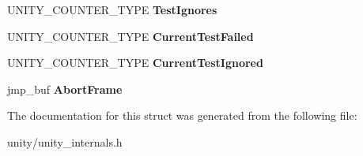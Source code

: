 \begin{DoxyCompactItemize}
\item 
\mbox{\label{struct_u_n_i_t_y___s_t_o_r_a_g_e___t_a4fd439067fb0c1a82a5219077a513cda}} 
U\+N\+I\+T\+Y\+\_\+\+C\+O\+U\+N\+T\+E\+R\+\_\+\+T\+Y\+PE {\bfseries Test\+Ignores}
\item 
\mbox{\label{struct_u_n_i_t_y___s_t_o_r_a_g_e___t_a60446b592f7989b0f639da4132032a43}} 
U\+N\+I\+T\+Y\+\_\+\+C\+O\+U\+N\+T\+E\+R\+\_\+\+T\+Y\+PE {\bfseries Current\+Test\+Failed}
\item 
\mbox{\label{struct_u_n_i_t_y___s_t_o_r_a_g_e___t_ad69a0f6ea7ca97f43b963c8218eca9d6}} 
U\+N\+I\+T\+Y\+\_\+\+C\+O\+U\+N\+T\+E\+R\+\_\+\+T\+Y\+PE {\bfseries Current\+Test\+Ignored}
\item 
\mbox{\label{struct_u_n_i_t_y___s_t_o_r_a_g_e___t_add1ad6305e99da2ddf841e32dfbd8bd5}} 
jmp\+\_\+buf {\bfseries Abort\+Frame}
\end{DoxyCompactItemize}


The documentation for this struct was generated from the following file\+:\begin{DoxyCompactItemize}
\item 
unity/unity\+\_\+internals.\+h\end{DoxyCompactItemize}
